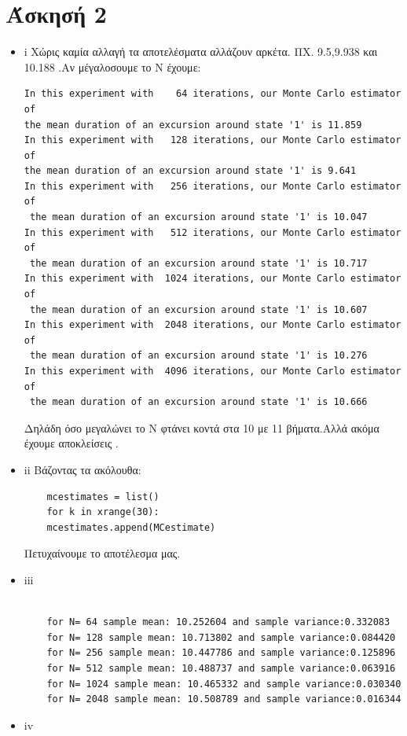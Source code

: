 \documentclass{article}
\begin{document}
\section*{Άσκησή 2}
\begin{itemize}
	\item i
		Χώρις καμία αλλαγή τα αποτελέσματα αλλάζουν αρκέτα. ΠΧ.
	 9.5,9.938 και 10.188 .Αν μέγαλοσουμε το N έχουμε:
	 \begin{lstlisting}
In this experiment with    64 iterations, our Monte Carlo estimator of 
the mean duration of an excursion around state '1' is 11.859
In this experiment with   128 iterations, our Monte Carlo estimator of 
the mean duration of an excursion around state '1' is 9.641
In this experiment with   256 iterations, our Monte Carlo estimator of
 the mean duration of an excursion around state '1' is 10.047
In this experiment with   512 iterations, our Monte Carlo estimator of
 the mean duration of an excursion around state '1' is 10.717
In this experiment with  1024 iterations, our Monte Carlo estimator of
 the mean duration of an excursion around state '1' is 10.607
In this experiment with  2048 iterations, our Monte Carlo estimator of
 the mean duration of an excursion around state '1' is 10.276
In this experiment with  4096 iterations, our Monte Carlo estimator of
 the mean duration of an excursion around state '1' is 10.666

	 \end{lstlisting}
Δηλάδη όσο μεγαλώνει το Ν φτάνει κοντά στα 10 με 11 βήματα.Αλλά ακόμα έχουμε αποκλείσεις .
\item ii
	Βάζοντας τα ακόλουθα: 
	\begin{lstlisting}
	mcestimates = list()
	for k in xrange(30):
	mcestimates.append(MCestimate)

	\end{lstlisting}
	Πετυχαίνουμε το αποτέλεσμα μας. 
\item iii
	 \begin{lstlisting}

	for N= 64 sample mean: 10.252604 and sample variance:0.332083
	for N= 128 sample mean: 10.713802 and sample variance:0.084420
	for N= 256 sample mean: 10.447786 and sample variance:0.125896
	for N= 512 sample mean: 10.488737 and sample variance:0.063916
	for N= 1024 sample mean: 10.465332 and sample variance:0.030340
	for N= 2048 sample mean: 10.508789 and sample variance:0.016344
\end{lstlisting}
\item iv 


\end{itemize}
\end{document}
